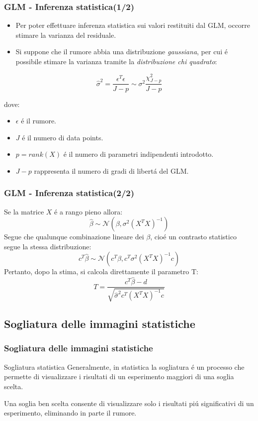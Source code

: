 \documentclass{beamer}
\begin{document}
\begin{frame}
\frametitle{GLM - Inferenza statistica(1/2)}

\begin{itemize}
\item Per poter effettuare inferenza statistica sui valori restituiti dal GLM, occorre stimare la \alert{varianza del residuale}.
\item Si suppone che il rumore abbia una distribuzione \emph{gaussiana}, per cui \'e possibile stimare la varianza tramite la \emph{distribuzione chi quadrato}:
\end{itemize}
 
$$\hat{\sigma}^2 = \frac{\epsilon^T\epsilon}{J - p} \sim \sigma^2 \frac{\chi^2_{J-p}}{J-p}$$

dove: 
\begin{itemize}
\item $\epsilon$ \'e il rumore.
\item $J$ \'e il numero di data points.
\item $p = rank(X) $ \'e il numero di parametri indipendenti introdotto.
\item $J-p$ rappresenta il numero di \alert{gradi di libert\'a} del GLM.
\end{itemize}
\end{frame}

\begin{frame}
\frametitle{GLM - Inferenza statistica(2/2)}
Se la matrice $X$ \'e a rango pieno allora:
$$\hat{\beta} \sim \mathcal{N}(\beta, \sigma^2(X^TX)^{-1})$$
Segue che qualunque combinazione lineare dei $\beta$, cio\'e un \alert{contrasto statistico} segue la stessa distribuzione:
$$c^T\hat{\beta} \sim \mathcal{N}(c^T\beta, c^T\sigma^2(X^TX)^{-1}c)$$
Pertanto, dopo la stima, si calcola direttamente il parametro T:
$$T = \frac{c^T\hat{\beta} - d}{\sqrt{\hat{\sigma}^2c^T(X^TX)^{-1}c}}$$
\end{frame}


\subsection{Sogliatura delle immagini statistiche}
\begin{frame}
\frametitle{Sogliatura delle immagini statistiche}
\begin{block}{Sogliatura statistica}
Generalmente, in statistica \alert{la sogliatura} \'e un processo che permette di visualizzare i risultati di un esperimento maggiori di una soglia scelta. 
\end{block}

\bigskip

Una soglia ben scelta consente di visualizzare solo i risultati pi\'u significativi di un esperimento, eliminando in parte il rumore.
\end{frame}
\end{document}
